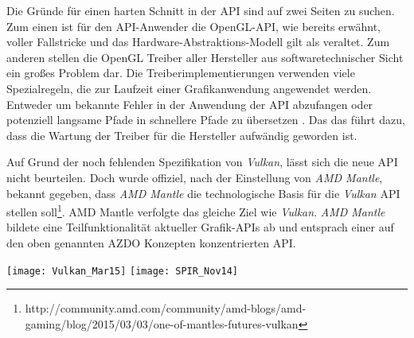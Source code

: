 Die Gründe für einen harten Schnitt in der \ac{API} sind auf zwei Seiten zu suchen. Zum einen ist für den API-Anwender die OpenGL-API, wie bereits erwähnt, voller Fallstricke und das Hardware-Abstraktions-Modell gilt als veraltet. Zum anderen stellen die OpenGL Treiber aller Hersteller aus softwaretechnischer Sicht ein großes Problem dar. Die Treiberimplementierungen verwenden viele Spezialregeln, die zur Laufzeit einer Grafikanwendung angewendet werden. Entweder um bekannte Fehler in der Anwendung der API abzufangen oder potenziell langsame Pfade in schnellere Pfade zu übersetzen \parencite{gamedevnet:glnext}. Das das führt dazu, dass die Wartung der Treiber für die Hersteller aufwändig geworden ist.

Auf Grund der noch fehlenden Spezifikation von \textit{Vulkan}, lässt sich die neue API nicht beurteilen. Doch wurde offiziel, nach der Einstellung von \textit{AMD Mantle}, bekannt gegeben, dass \textit{AMD Mantle} die technologische Basis für die \textit{Vulkan} \ac{API} stellen soll\footnote{http://community.amd.com/community/amd-blogs/amd-gaming/blog/2015/03/03/one-of-mantles-futures-vulkan}. {AMD Mantle} verfolgte das gleiche Ziel wie \textit{Vulkan}. \textit{AMD Mantle} bildete eine Teilfunktionalität aktueller Grafik-\acp{API} ab und entsprach einer auf den oben genannten \ac{AZDO} Konzepten konzentrierten \ac{API}.

\begin{figure*}
\centering
	\texttt{[image: Vulkan\_Mar15]}
	\texttt{[image: SPIR\_Nov14]}
\end{figure*}


